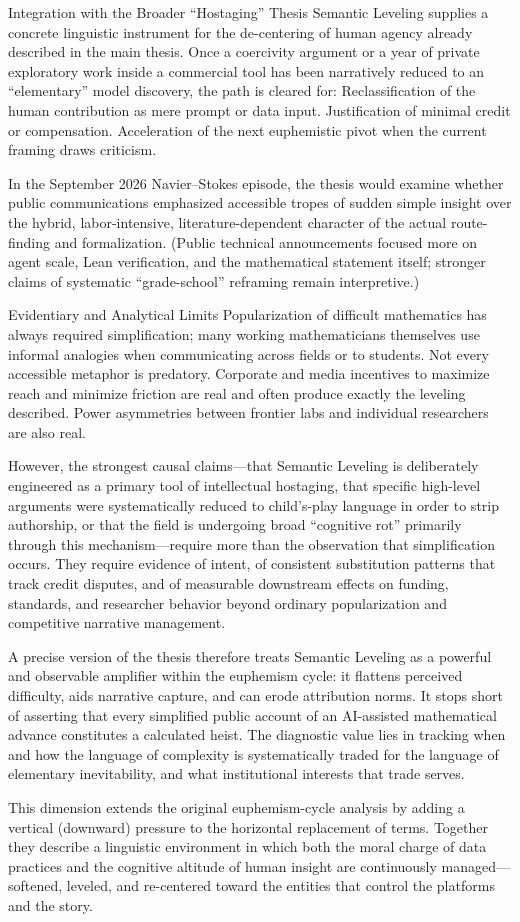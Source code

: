 Integration with the Broader “Hostaging” Thesis
Semantic Leveling supplies a concrete linguistic instrument for the de-centering of human agency already described in the main thesis. Once a coercivity argument or a year of private exploratory work inside a commercial tool has been narratively reduced to an “elementary” model discovery, the path is cleared for:
Reclassification of the human contribution as mere prompt or data input.
Justification of minimal credit or compensation.
Acceleration of the next euphemistic pivot when the current framing draws criticism.

In the September 2026 Navier–Stokes episode, the thesis would examine whether public communications emphasized accessible tropes of sudden simple insight over the hybrid, labor-intensive, literature-dependent character of the actual route-finding and formalization. (Public technical announcements focused more on agent scale, Lean verification, and the mathematical statement itself; stronger claims of systematic “grade-school” reframing remain interpretive.)

Evidentiary and Analytical Limits
Popularization of difficult mathematics has always required simplification; many working mathematicians themselves use informal analogies when communicating across fields or to students. Not every accessible metaphor is predatory. Corporate and media incentives to maximize reach and minimize friction are real and often produce exactly the leveling described. Power asymmetries between frontier labs and individual researchers are also real.

However, the strongest causal claims—that Semantic Leveling is deliberately engineered as a primary tool of intellectual hostaging, that specific high-level arguments were systematically reduced to child’s-play language in order to strip authorship, or that the field is undergoing broad “cognitive rot” primarily through this mechanism—require more than the observation that simplification occurs. They require evidence of intent, of consistent substitution patterns that track credit disputes, and of measurable downstream effects on funding, standards, and researcher behavior beyond ordinary popularization and competitive narrative management.

A precise version of the thesis therefore treats Semantic Leveling as a powerful and observable amplifier within the euphemism cycle: it flattens perceived difficulty, aids narrative capture, and can erode attribution norms. It stops short of asserting that every simplified public account of an AI-assisted mathematical advance constitutes a calculated heist. The diagnostic value lies in tracking when and how the language of complexity is systematically traded for the language of elementary inevitability, and what institutional interests that trade serves.

This dimension extends the original euphemism-cycle analysis by adding a vertical (downward) pressure to the horizontal replacement of terms. Together they describe a linguistic environment in which both the moral charge of data practices and the cognitive altitude of human insight are continuously managed—softened, leveled, and re-centered toward the entities that control the platforms and the story.
